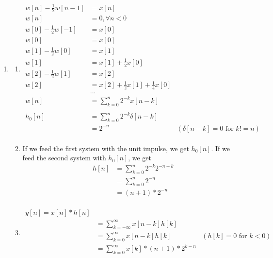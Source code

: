 \documentclass[10pt,a4paper, margin=1in]{article}
\begin{document}
\begin{enumerate}
\item %
    \begin{enumerate}
    \item %
    \begin{align*}
        w[n] - \frac{1}{2}w[n - 1] & = x[n]\\
        w[n] & = 0,  \forall n < 0 \\
        w[0] - \frac{1}{2}w[-1] & = x[0]\\
        w[0] & = x[0]\\
        w[1] - \frac{1}{2}w[0] & = x[1]\\
        w[1] & = x[1] + \frac{1}{2}x[0]\\
        w[2] - \frac{1}{2}w[1] & = x[2]\\
        w[2] & = x[2] + \frac{1}{2}x[1] + \frac{1}{4}x[0]\\
        &...\\
        w[n] & = \sum_{k = 0}^{n} 2^{-k}x[n - k]\\
        & \\
        h_0[n] & = \sum_{k = 0}^{n} 2^{-k}\delta[n - k]\\
        & = 2^{-n} & (\delta[n-k] = 0 \text{ for } k != n)\\
    \end{align*}
    \item
    If we feed the first system with the unit impulse, we get $h_0[n]$. If we feed the second system with $h_0[n]$, we get
    \begin{align*}
        h[n] &= \sum_{k = 0}^{n} 2^{-k}2^{-n+k} \\
        &= \sum_{k = 0}^{n} 2^{-n} \\
        &= (n+1) * 2^{-n} \\
    \end{align*}
    \item \begin{align*}
        y[n] = x[n] * h[n] \\
        &= \sum_{k = -\infty}^{\infty} x[n-k]h[k] \\
        &= \sum_{k = 0}^{\infty} x[n-k]h[k] & (h[k] = 0 \text{ for } k < 0)\\
        &= \sum_{k = 0}^{\infty} x[k]*(n+1) * 2^{k-n} \\
    \end{align*}
    \end{enumerate}
    

\end{enumerate}
\end{document}
